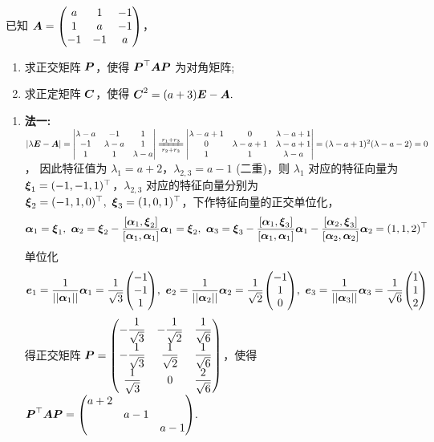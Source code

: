 \begin{example}[2019 数一]
    已知 $\vb*{A}=\mqty(a&1&-1\\1&a&-1\\-1&-1&a)$，
    \begin{enumerate}[label=(\arabic{*})]
        \item 求正交矩阵 $\vb*{P}$，使得 $\vb*{P}^\top\vb*{AP}$ 为对角矩阵;
        \item 求正定矩阵 $\vb*{C}$，使得 $\vb*{C}^2=(a+3)\vb*{E}-\vb*{A}.$
    \end{enumerate}
\end{example}
\begin{solution}
    \begin{enumerate}[label=(\arabic{*})]
        \item \textbf{法一: }$|\lambda\vb*{E}-\vb*{A}|=\mqty|\lambda-a&-1&1\\-1&\lambda-a&1\\1&1&\lambda-a|\xlongequal[r_2+r_3]{r_1+r_3}\mqty|\lambda-a+1&0&\lambda-a+1\\0&\lambda-a+1&\lambda-a+1\\1&1&\lambda-a|=(\lambda-a+1)^2(\lambda-a-2)=0$，
        因此特征值为 $\lambda_1=a+2$，$\lambda_{2,3}=a-1$ (二重)，则 $\lambda_1$ 对应的特征向量为 $\vb*{\xi}_1=(-1,-1,1)^\top$，$\lambda_{2,3}$ 对应的特征向量分别为 $\vb*{\xi}_2=(-1,1,0)^\top,~\vb*{\xi}_3=(1,0,1)^\top$，下作特征向量的正交单位化，
        $$\vb*{\alpha}_1=\vb*{\xi}_1,~\vb*{\alpha}_2=\vb*{\xi}_2-\dfrac{\qty[\vb*{\alpha}_1,\vb*{\xi}_2]}{\qty[\vb*{\alpha}_1,\vb*{\alpha}_1]}\vb*{\alpha}_1=\vb*{\xi}_2,~\vb*{\alpha}_3=\vb*{\xi}_3-\dfrac{\qty[\vb*{\alpha}_1,\vb*{\xi}_3]}{\qty[\vb*{\alpha}_1,\vb*{\alpha}_1]}\vb*{\alpha}_1-\dfrac{\qty[\vb*{\alpha}_2,\vb*{\xi}_3]}{\qty[\vb*{\alpha}_2,\vb*{\alpha}_2]}\vb*{\alpha}_2=(1,1,2)^\top$$
        单位化 $$\vb*{e}_1=\dfrac{1}{||\vb*{\alpha}_1||}\vb*{\alpha}_1=\dfrac{1}{\sqrt{3}}\mqty(-1\\-1\\1),~\vb*{e}_2=\dfrac{1}{||\vb*{\alpha}_2||}\vb*{\alpha}_2=\dfrac{1}{\sqrt{2}}\mqty(-1\\1\\0),~\vb*{e}_3=\dfrac{1}{||\vb*{\alpha}_3||}\vb*{\alpha}_3=\dfrac{1}{\sqrt{6}}\mqty(1\\1\\2)$$
        得正交矩阵 $\vb*{P}=\mqty(-\dfrac{1}{\sqrt{3}}&-\dfrac{1}{\sqrt{2}}&\dfrac{1}{\sqrt{6}}\\[6pt]-\dfrac{1}{\sqrt{3}}&\dfrac{1}{\sqrt{2}}&\dfrac{1}{\sqrt{6}}\\[6pt]\dfrac{1}{\sqrt{3}}&0&\dfrac{2}{\sqrt{6}})$，使得 $\vb*{P}^\top\vb*{AP}=\mqty(a+2\\&a-1\\&&a-1).$\\

\end{enumerate}
\end{solution}
